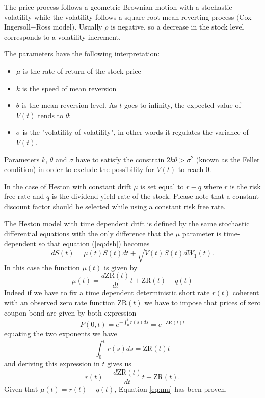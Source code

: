 The price process follows a geometric Brownian motion with a stochastic volatility while the volatility follows a square root mean reverting process $($Cox$-$Ingersoll$-$Ross model$)$. Usually $\rho$ is negative, so a decrease in the stock level corresponds to a volatility increment. 

The parameters have the following interpretation:
\begin{itemize}
\item $\mu$ is the rate of return of the stock price
\item $k$ is the speed of mean reversion
\item $\theta$ is the mean reversion level. As $t$ goes to infinity, the expected value of $V(t)$ tends to $\theta$:
\item $\sigma$ is the "volatility of volatility", in other words it regulates the variance of $V(t)$.
\end{itemize}

Parameters $k$, $\theta$ and $\sigma$ have to satisfy the constrain $2k\theta>\sigma^2$ (known as the Feller condition) in order to exclude the possibility for $V(t)$ to reach 0.

In the case of Heston with constant drift $\mu$ is set equal to $r-q$ where $r$ is the risk free rate and $q$ is the dividend yield rate of the stock. 
Please note that a constant discount factor should be selected while using a constant risk free rate.

The Heston model with time dependent drift is defined by the same stochastic differential equations with the only difference that the $\mu$ parameter is time-dependent so that equation (\ref{eq:dsh}) becomes
\begin{equation}
dS(t) = \mu(t) S(t)dt + \sqrt{V(t)}S(t)dW_1(t).
\end{equation}
In this case the function $\mu(t)$ is given by
\begin{equation}\label{eq:mu}
\mu(t) = \frac{d\mathrm{ZR}(t)}{dt}t + \mathrm{ZR}(t) - q(t)
\end{equation}
Indeed if we have to fix a time dependent deterministic short rate $r(t)$ coherent with an observed zero rate function $\mathrm{ZR}(t)$ we have to impose that prices of zero coupon bond are given by both expression
\begin{equation}
P(0,t) = e^{-\int_0^t r(s)ds} = e^{-\mathrm{ZR}(t)t}
\end{equation}
equating the two exponents we have
\begin{equation}
\int_0^t r(s)ds = \mathrm{ZR}(t)t
\end{equation}
and deriving this expression in $t$ gives us
\begin{equation}
r(t) = \frac{d\mathrm{ZR}(t)}{dt}t + \mathrm{ZR}(t).
\end{equation}
Given that $\mu(t) = r(t) - q(t)$, Equation \ref{eq:mu} has been proven.



